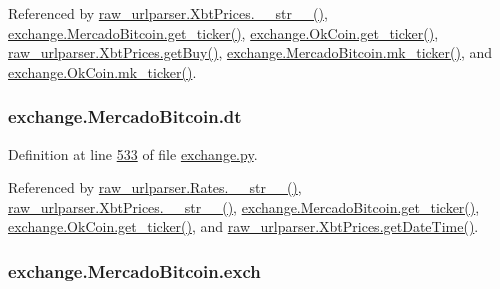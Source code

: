 Referenced by \hyperlink{raw__urlparser_8py_source_l00074}{raw\+\_\+urlparser.\+Xbt\+Prices.\+\_\+\+\_\+str\+\_\+\+\_\+()}, \hyperlink{exchange_8py_source_l00535}{exchange.\+Mercado\+Bitcoin.\+get\+\_\+ticker()}, \hyperlink{exchange_8py_source_l00600}{exchange.\+Ok\+Coin.\+get\+\_\+ticker()}, \hyperlink{raw__urlparser_8py_source_l00062}{raw\+\_\+urlparser.\+Xbt\+Prices.\+get\+Buy()}, \hyperlink{exchange_8py_source_l00549}{exchange.\+Mercado\+Bitcoin.\+mk\+\_\+ticker()}, and \hyperlink{exchange_8py_source_l00614}{exchange.\+Ok\+Coin.\+mk\+\_\+ticker()}.

\subsubsection[{\texorpdfstring{dt}{dt}}]{\setlength{\rightskip}{0pt plus 5cm}exchange.\+Mercado\+Bitcoin.\+dt}\hypertarget{classexchange_1_1_mercado_bitcoin_aeee983ba4f72223a11fb914d22902c56}{}\label{classexchange_1_1_mercado_bitcoin_aeee983ba4f72223a11fb914d22902c56}


Definition at line \hyperlink{exchange_8py_source_l00533}{533} of file \hyperlink{exchange_8py_source}{exchange.\+py}.



Referenced by \hyperlink{raw__urlparser_8py_source_l00038}{raw\+\_\+urlparser.\+Rates.\+\_\+\+\_\+str\+\_\+\+\_\+()}, \hyperlink{raw__urlparser_8py_source_l00074}{raw\+\_\+urlparser.\+Xbt\+Prices.\+\_\+\+\_\+str\+\_\+\+\_\+()}, \hyperlink{exchange_8py_source_l00535}{exchange.\+Mercado\+Bitcoin.\+get\+\_\+ticker()}, \hyperlink{exchange_8py_source_l00600}{exchange.\+Ok\+Coin.\+get\+\_\+ticker()}, and \hyperlink{raw__urlparser_8py_source_l00059}{raw\+\_\+urlparser.\+Xbt\+Prices.\+get\+Date\+Time()}.

\subsubsection[{\texorpdfstring{exch}{exch}}]{\setlength{\rightskip}{0pt plus 5cm}exchange.\+Mercado\+Bitcoin.\+exch}\hypertarget{classexchange_1_1_mercado_bitcoin_a68701550b43374441e52ea2082d88400}{}\label{classexchange_1_1_mercado_bitcoin_a68701550b43374441e52ea2082d88400}


